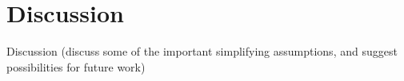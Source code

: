 \section{Discussion}
\label{sec:discussion}

Discussion (discuss some of the important simplifying assumptions, and
suggest possibilities for future work)
